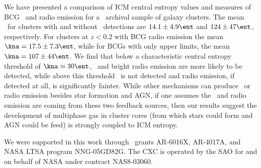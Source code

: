 \documentclass{emulateapj}
\begin{document}
We have presented a comparison of ICM central entropy values and
measures of BCG \halpha\ and radio emission for a \Chandra\ archival
sample of galaxy clusters. The mean \kna\ for clusters with and
without \halpha\ detections are $14.1 \pm 4.9 \ent$ and $124 \pm 47
\ent$, respectively. For clusters at $z < 0.2$ with BCG radio emission
the mean $\kna = 17.5 \pm 7.3 \ent$, while for BCGs with only upper
limits, the mean $\kna = 107 \pm 44 \ent$. We find that below a
characteristic central entropy threshold of $\kna \approx 30 \ent$,
\halpha\ and bright radio emission are more likely to be detected,
while above this threshold \halpha\ is not detected and radio
emission, if detected at all, is significantly fainter. While other
mechanisms can produce \halpha\ or radio emission besides star
formation and AGN, if one assumes the \halpha\ and radio emission are
coming from these two feedback sources, then our results suggest the
development of multiphase gas in cluster cores (from which stars could
form and AGN could be feed) is strongly coupled to ICM entropy.

\acknowledgements
We were supported in this work through \Chandra\ grants AR-6016X,
AR-4017A, and NASA LTSA program NNG-05GD82G. The CXC is operated by
the SAO for and on behalf of NASA under contract NAS8-03060.



\end{document}
